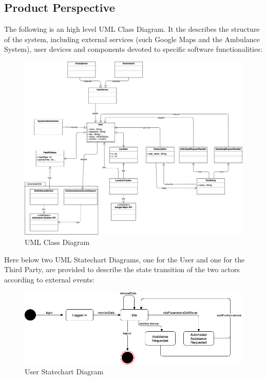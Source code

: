 \documentclass[12pt,a4paper]{article}
\begin{document}
		\subsection{Product Perspective}
			The following is an high level UML Class Diagram. It the describes the structure of the system, including external services (such Google Maps and the Ambulance System), user devices and components devoted to specific software functionalities: 
			\begin{figure}[h]
				\centering
				\includegraphics[width=1.25\linewidth]{Images/uml}
				\caption{UML Class Diagram}
				\label{fig:uml}
			\end{figure}
			\newpage
			Here below two UML Statechart Diagrams, one for the User and one for the Third Party, are provided to describe the state transition of the two actors according to external events: 
			\begin{figure}[H]
				\centering
				\includegraphics[width=1.0\linewidth]{Images/statechart_user}
				\caption{User Statechart Diagram}
				\label{fig:statechart_user}
			\end{figure}
\end{document}
